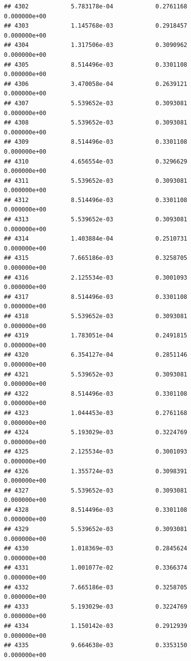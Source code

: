 \documentclass[
]{article}
\begin{document}
\begin{verbatim}
## 4302            5.783178e-04            0.2761168            0.000000e+00
## 4303            1.145768e-03            0.2918457            0.000000e+00
## 4304            1.317506e-03            0.3090962            0.000000e+00
## 4305            8.514496e-03            0.3301108            0.000000e+00
## 4306            3.470058e-04            0.2639121            0.000000e+00
## 4307            5.539652e-03            0.3093081            0.000000e+00
## 4308            5.539652e-03            0.3093081            0.000000e+00
## 4309            8.514496e-03            0.3301108            0.000000e+00
## 4310            4.656554e-03            0.3296629            0.000000e+00
## 4311            5.539652e-03            0.3093081            0.000000e+00
## 4312            8.514496e-03            0.3301108            0.000000e+00
## 4313            5.539652e-03            0.3093081            0.000000e+00
## 4314            1.403884e-04            0.2510731            0.000000e+00
## 4315            7.665186e-03            0.3258705            0.000000e+00
## 4316            2.125534e-03            0.3001093            0.000000e+00
## 4317            8.514496e-03            0.3301108            0.000000e+00
## 4318            5.539652e-03            0.3093081            0.000000e+00
## 4319            1.783051e-04            0.2491815            0.000000e+00
## 4320            6.354127e-04            0.2851146            0.000000e+00
## 4321            5.539652e-03            0.3093081            0.000000e+00
## 4322            8.514496e-03            0.3301108            0.000000e+00
## 4323            1.044453e-03            0.2761168            0.000000e+00
## 4324            5.193029e-03            0.3224769            0.000000e+00
## 4325            2.125534e-03            0.3001093            0.000000e+00
## 4326            1.355724e-03            0.3098391            0.000000e+00
## 4327            5.539652e-03            0.3093081            0.000000e+00
## 4328            8.514496e-03            0.3301108            0.000000e+00
## 4329            5.539652e-03            0.3093081            0.000000e+00
## 4330            1.018369e-03            0.2845624            0.000000e+00
## 4331            1.001077e-02            0.3366374            0.000000e+00
## 4332            7.665186e-03            0.3258705            0.000000e+00
## 4333            5.193029e-03            0.3224769            0.000000e+00
## 4334            1.150142e-03            0.2912939            0.000000e+00
## 4335            9.664638e-03            0.3353150            0.000000e+00

\end{verbatim}
\end{document}
